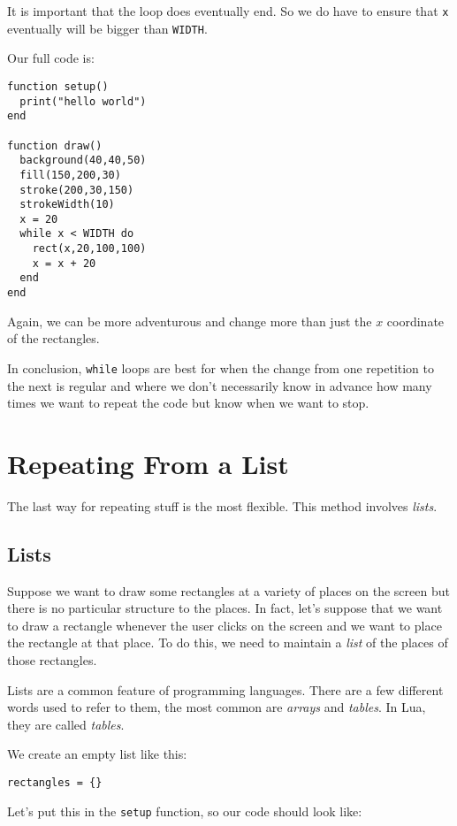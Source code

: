 \documentclass[
  xhtml,%
  use filename%
]{internet}
\begin{document}
It is important that the loop does eventually end.
So we do have to ensure that \verb+x+ eventually will be bigger than \verb+WIDTH+.

Our full code is:

\begin{verbatim}
function setup()
  print("hello world")
end

function draw()
  background(40,40,50)
  fill(150,200,30)
  stroke(200,30,150)
  strokeWidth(10)
  x = 20
  while x < WIDTH do
    rect(x,20,100,100)
    x = x + 20
  end
end
\end{verbatim}

Again, we can be more adventurous and change more than just the \(x\) coordinate of the rectangles.

In conclusion, \verb+while+ loops are best for when the change from one repetition to the next is regular and where we don't necessarily know in advance how many times we want to repeat the code but know when we want to stop.

\section{Repeating From a List}

The last way for repeating stuff is the most flexible.
This method involves \emph{lists}.

\subsection{Lists}

Suppose we want to draw some rectangles at a variety of places on the screen but there is no particular structure to the places.
In fact, let's suppose that we want to draw a rectangle whenever the user clicks on the screen and we want to place the rectangle at that place.
To do this, we need to maintain a \emph{list} of the places of those rectangles.

Lists are a common feature of programming languages.
There are a few different words used to refer to them, the most common are \emph{arrays} and \emph{tables}.
In Lua, they are called \emph{tables}.

We create an empty list like this:

\begin{verbatim}
rectangles = {}
\end{verbatim}

Let's put this in the \verb+setup+ function, so our code should look like:
\end{document}
